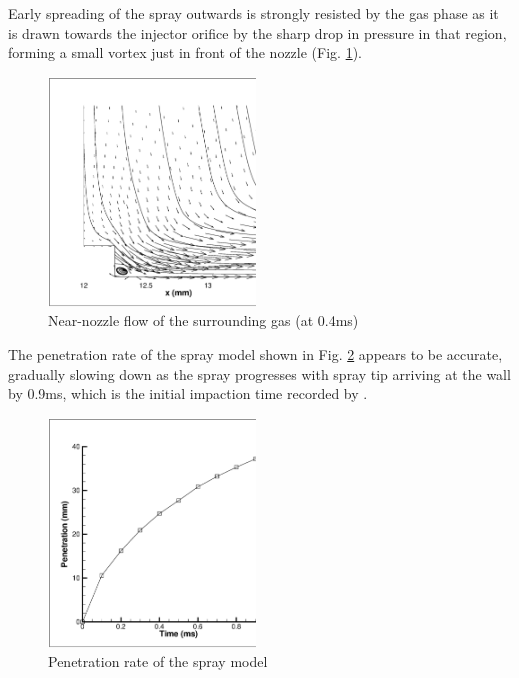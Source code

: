 \documentclass[a4paper,10pt]{article}
\begin{document}
Early spreading of the spray outwards is strongly resisted by the gas phase as it is drawn towards the injector orifice by the sharp drop in pressure in that region, forming a small vortex just in front of the nozzle (Fig. \ref{fig:inj_gas}).
\begin{figure}[H]
\centering
\includegraphics[width=0.49\textwidth]{inj_gas.eps}
\caption{Near-nozzle flow of the surrounding gas (at 0.4ms)}
\label{fig:inj_gas}
\end{figure}

The penetration rate of the spray model shown in Fig. \ref{fig:spr_pen} appears to be accurate, gradually slowing down as the spray progresses with spray tip arriving at the wall by 0.9ms, which is the initial impaction time recorded by \cite{park2004}.
\begin{figure}[H]
\centering
\includegraphics[width=0.49\textwidth]{pen.eps}
\caption{Penetration rate of the spray model}
\label{fig:spr_pen}
\end{figure}
\end{document}
